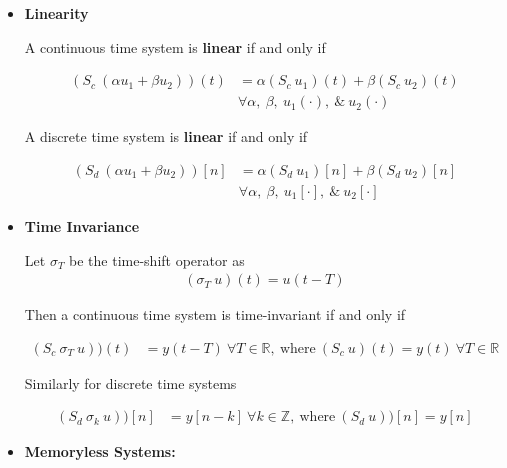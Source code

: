 \documentclass[12pt,oneside]{amsart}
\begin{document}
\begin{itemize}

\item \textbf{Linearity} 
\vspace{6pt}

A continuous time system is \textbf{linear} if and only if

\begin{align*}
(S_c \ (\alpha u_1 + \beta u_2) ) (t) &= \alpha  (S_c \ u_1) (t) +
  \beta  (S_c \ u_2 ) (t) \\ 
&\forall \alpha , \ \beta, \ u_1(\cdot), \ \& \ u_2(\cdot) 
\end{align*}

A discrete time system is \textbf{linear} if and only if

\begin{align*}
(S_d \ (\alpha u_1 + \beta u_2) ) [n] &= \alpha  (S_d \ u_1) [n] +
  \beta  (S_d \ u_2 ) [n] \\ 
&\forall \alpha , \ \beta, \ u_1[\cdot], \ \& \ u_2[\cdot] 
\end{align*}

\item \textbf{Time Invariance}
\vspace{6pt}

Let $\sigma_T$ be the time-shift operator as
%
\begin{align*}
( \sigma_T \ u )(t) = u(t-T)
\end{align*}

Then a continuous time system is time-invariant if and only if 

\begin{align*}
(S_c \ \sigma_T \ u) ) (t) &= y(t - T) \ \forall T \in \mathbb{R}, \
                             \mathrm{where} \ (S_c \ u ) (t) = y(t) \ \forall T \in \mathbb{R}
\end{align*}

\vspace{6pt}

Similarly for discrete time systems

\begin{align*}
(S_d \ \sigma_k \ u) ) [n] &= y[n-k] \ \forall k \in \mathbb{Z}, \ \mathrm{where} \ (S_d \ u) ) [n] = y[n]
\end{align*}

\vspace{6pt}

\item \textbf{Memoryless Systems:}

\vspace{6pt}


\end{itemize}
\end{document}
